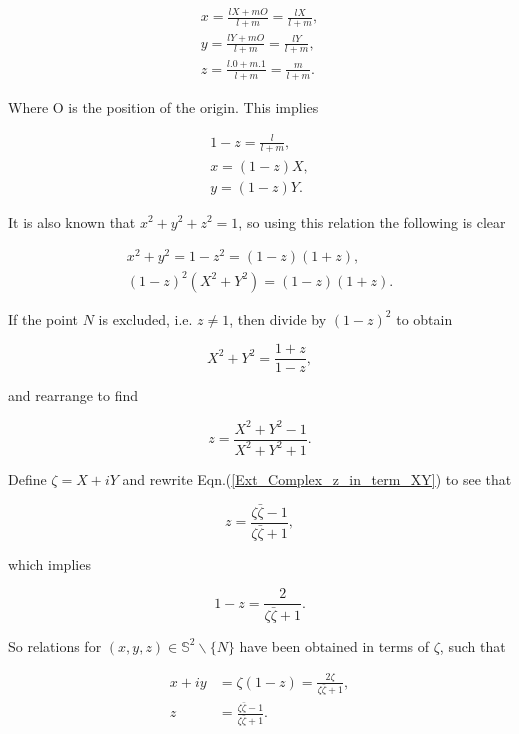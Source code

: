 \begin{eqnarray*}  
x = \frac{lX + mO}{l+m} = \frac{lX}{l+m}, \\
y = \frac{lY + mO}{l+m} = \frac{lY}{l+m}, \\
z = \frac{l.0+ m.1}{l+m} = \frac{m}{l+m}.
\end{eqnarray*}

\noindent Where O is the position of the origin. This implies

\begin{eqnarray*}
1-z = \frac{l}{l+m}, \\
x = (1-z)X, \\
y = (1-z)Y.
\end{eqnarray*}

\noindent It is also known that $x^2+ y^2 +z^2 = 1$, so using this relation the following is clear

\begin{eqnarray*}
x^2 + y^2 = 1-z^2 = (1-z) (1+z), \\
(1-z)^2(X^2 +Y^2) = (1-z) (1+z).
\end{eqnarray*}

\noindent If the point $N$ is excluded, i.e. $z \neq 1$, then divide by $(1-z)^2$ to obtain

\begin{equation*} 
X^2 + Y^2 = \frac{1+z}{1-z},
\end{equation*}

\noindent and rearrange to find

\begin{equation}\label{Ext_Complex_z_in_term_XY} 
z = \frac{X^2 + Y^2 - 1}{X^2 + Y^2 + 1}.
\end{equation}

Define $\zeta = X+ iY$ and rewrite Eqn.(\ref{Ext_Complex_z_in_term_XY}) to see that

\begin{equation*}
z = \frac{\zeta\bar{\zeta} - 1}{\zeta\bar{\zeta} + 1},
\end{equation*}

\noindent which implies

\begin{equation*}
1- z = \frac{2}{\zeta\bar{\zeta} + 1}.
\end{equation*}

\noindent So relations for $(x,y,z) \in \mathbb{S}^2 \backslash \{N\}$ have been obtained in terms of $\zeta$, such that

\begin{align}\label{Ext_Complex_xy_interms_zeta}
x + iy & = \zeta (1-z) = \frac{2\zeta}{\zeta\bar{\zeta} + 1}, \\\label{Ext_Complex_z_interms_zeta}
z  & = \frac{\zeta\bar{\zeta} - 1}{\zeta\bar{\zeta} + 1}.
\end{align}

